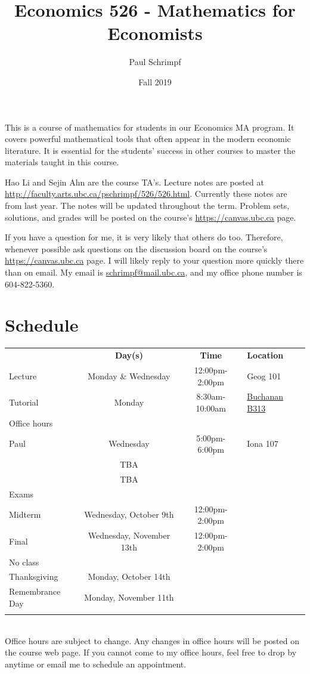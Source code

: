 \documentclass[10pt]{article}
\title{Economics 526 - Mathematics for Economists}
\date{Fall 2019}
\author{Paul Schrimpf}
\begin{document}
\maketitle

This is a course of mathematics for students in our Economics MA
program. It covers powerful mathematical tools that often appear
in the modern economic literature. It is essential for the students'
success in other courses to master the materials taught in this
course.

Hao Li and Sejin Ahn are the course TA's.  Lecture notes are posted
at \url{http://faculty.arts.ubc.ca/pschrimpf/526/526.html}. Currently
these notes are from last year. The notes will be updated throughout
the term. Problem sets, solutions, and grades will be posted on the
course's \url{https://canvas.ubc.ca} page.

If you have a question for me, it is very likely that others do
too. Therefore, whenever possible ask questions on the discussion
board on the course's \url{https://canvas.ubc.ca} page.  I will likely
reply to your question more quickly there than on email. My email is
\href{mailto:schrimp@mail.ubc.ca}{schrimpf@mail.ubc.ca}, and my office
phone number is 604-822-5360.

\section{Schedule}
\begin{tabular}{l c c l}
  \hline 
  & \textbf{Day(s)} & \textbf{Time} & \textbf{Location} \\
  Lecture & Monday \& Wednesday & 12:00pm-2:00pm &   Geog 101 \\
  Tutorial & Monday & 8:30am-10:00am &
  \href{https://ssc.adm.ubc.ca/classroomservices/function/viewlocation?userEvent=ShowLocation&buildingID=BUCH&roomID=B313}{Buchanan B313} \\
  Office hours \\
  \; Paul & Wednesday & 5:00pm-6:00pm & Iona 107 \\
  \;  & TBA & & \\ 
  \;  & TBA & & \\ \hline
  Exams \\
  \; Midterm & Wednesday, October 9th & 12:00pm-2:00pm &
                                                         \\
  \; Final & Wednesday, November 13th & 12:00pm-2:00pm &
                                                         \\
  No class \\
  \; Thanksgiving & Monday, October 14th \\
  \; Remembrance Day & Monday, November 11th \\

  \\ \hline 
\end{tabular} \\
Office hours are subject to change. Any changes in office hours will
be posted on the course web page. If you cannot come to my office
hours, feel free to drop by anytime or email me to schedule an
appointment.  
\end{document}
